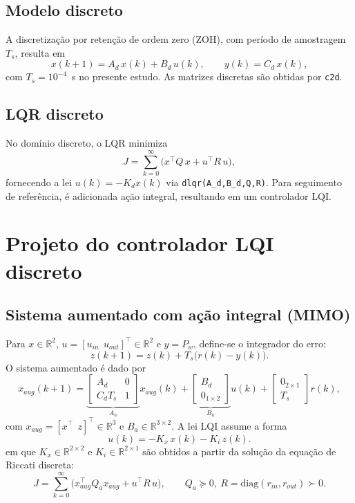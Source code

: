 \subsection{Modelo discreto}
\label{sec:modelo-discreto}
A discretização por retenção de ordem zero (ZOH), com período de amostragem $T_s$, resulta em
\[
    x(k+1)=A_d\,x(k)+B_d\,u(k),\qquad y(k)=C_d\,x(k),
\]
com $T_s=10^{-4}$~s no presente estudo. As matrizes discretas são obtidas por \texttt{c2d}.
\subsection{LQR discreto}
\label{sec:projeto-lqr-discreto}
No domínio discreto, o LQR minimiza
\[
    J=\sum_{k=0}^{\infty} \big(x^\top Q\,x + u^\top R\,u\big),
\]
fornecendo a lei $u(k)=-K_d x(k)$ via \texttt{dlqr(A\_d,B\_d,Q,R)}. Para seguimento de referência, é adicionada ação integral, resultando em um controlador LQI.
\section{Projeto do controlador LQI discreto}
\label{sec:controle-lqi-discreto}
\subsection{Sistema aumentado com ação integral (MIMO)}
\label{sec:lqi-mimo}
Para $x\in\mathbb{R}^2$, $u=[u_{in}\ \ u_{out}]^\top\in\mathbb{R}^2$ e $y=P_w$, define-se o integrador do erro:
\[
    z(k+1)=z(k)+T_s\big(r(k)-y(k)\big).
\]
O sistema aumentado é dado por
\[
    x_{aug}(k+1)=
    \underbrace{\begin{bmatrix}
            A_d     & 0 \\
            C_d T_s & 1
        \end{bmatrix}}_{A_a}
    x_{aug}(k)
    +
    \underbrace{\begin{bmatrix}
            B_d \\
            0_{1\times 2}
        \end{bmatrix}}_{B_a}
    u(k)
    +
    \begin{bmatrix}
        0_{2\times 1} \\
        T_s
    \end{bmatrix}r(k),
\]
com $x_{aug}=[x^\top\ \ z]^\top\in\mathbb{R}^3$ e $B_a\in\mathbb{R}^{3\times 2}$. A lei LQI assume a forma
\[
    u(k)=-K_x\,x(k)-K_i\,z(k).
\]
em que $K_x\in\mathbb{R}^{2\times 2}$ e $K_i\in\mathbb{R}^{2\times 1}$ são obtidos a partir da solução da equação de Riccati discreta:
\[
    J=\sum_{k=0}^{\infty}\big(x_{aug}^\top Q_a x_{aug}+u^\top R\,u\big),\qquad
    Q_a\succeq 0,\ R=\mathrm{diag}(r_{in},r_{out})\succ 0.
\]

